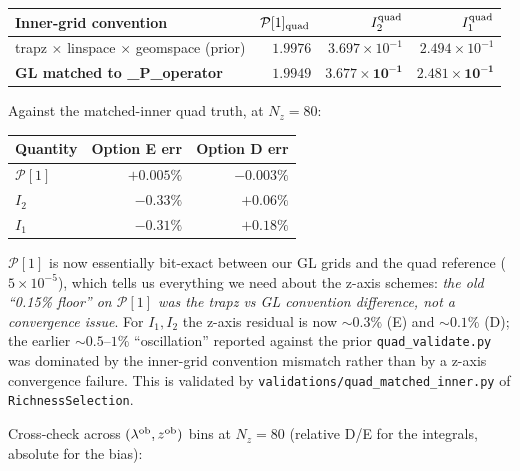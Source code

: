 \documentclass[11pt]{article}
\newcommand{\lob}{\lambda^{\rm ob}}
\newcommand{\zob}{z^{\rm ob}}
\newcommand{\Pop}{\mathcal{P}}
\begin{document}
\vspace{4pt}
\begin{center}
\small
\begin{tabular}{l r r r}
\toprule
Inner-grid convention & \(\Pop[1]_{\rm quad}\) & \(I_2^{\rm quad}\)
                      & \(I_1^{\rm quad}\) \\
\midrule
trapz \(\times\) linspace \(\times\) geomspace (prior)
                      & \(1.9976\) & \(3.697\!\times\!10^{-1}\)
                      & \(2.494\!\times\!10^{-1}\) \\
\textbf{GL matched to \_P\_operator}
                      & \(\mathbf{1.9949}\) & \(\mathbf{3.677\!\times\!10^{-1}}\)
                      & \(\mathbf{2.481\!\times\!10^{-1}}\) \\
\bottomrule
\end{tabular}
\end{center}

\vspace{4pt}
Against the matched-inner quad truth, at \(N_z\!=\!80\):

\vspace{4pt}
\begin{center}
\small
\begin{tabular}{l r r}
\toprule
Quantity & Option E err & Option D err \\
\midrule
\(\Pop[1]\) & \(+0.005\%\) & \(-0.003\%\) \\
\(I_2\)     & \(-0.33\%\)  & \(+0.06\%\)  \\
\(I_1\)     & \(-0.31\%\)  & \(+0.18\%\)  \\
\bottomrule
\end{tabular}
\end{center}

\(\Pop[1]\) is now essentially bit-exact between our GL grids and
the quad reference (\(5\!\times\!10^{-5}\)), which tells us
everything we need about the z-axis schemes: \emph{the old
``0.15\% floor'' on \(\Pop[1]\) was the trapz vs GL convention
difference, not a convergence issue}. For \(I_1, I_2\) the z-axis
residual is now \(\sim 0.3\%\) (E) and \(\sim 0.1\%\) (D); the
earlier \(\sim 0.5\)--\(1\%\) ``oscillation'' reported against the
prior \texttt{quad\_validate.py} was dominated by the inner-grid
convention mismatch rather than by a z-axis convergence failure.
This is validated by
\texttt{validations/quad\_matched\_inner.py} of
\texttt{RichnessSelection}.

\vspace{4pt}
Cross-check across \((\lob,\zob)\) bins at \(N_z=80\)
(relative D/E for the integrals, absolute for the bias):
\end{document}
